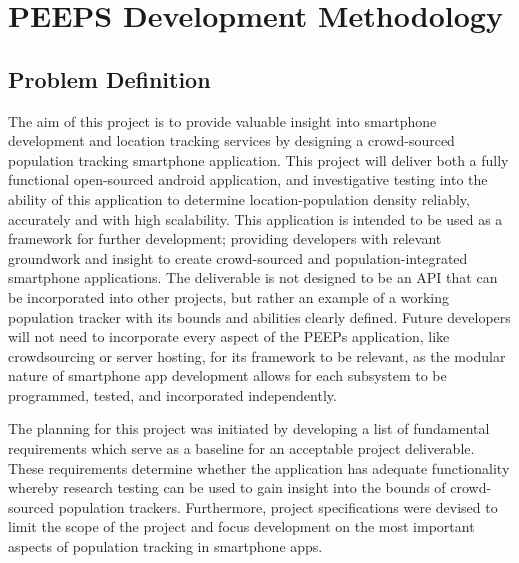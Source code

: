 \chapter{PEEPS Development Methodology}

\section{Problem Definition}
The aim of this project is to provide valuable insight into smartphone development and location tracking services by designing a crowd-sourced population tracking smartphone application. This project will deliver both a fully functional open-sourced android application, and investigative testing into the ability of this application to determine location-population density reliably, accurately and with high scalability. This application is intended to be used as a framework for further development; providing developers with relevant groundwork and insight to create crowd-sourced and population-integrated smartphone applications. The deliverable is not designed to be an API that can be incorporated into other projects, but rather an example of a working population tracker with its bounds and abilities clearly defined. Future developers will not need to incorporate every aspect of the PEEPs application, like crowdsourcing or server hosting, for its framework to be relevant, as the modular nature of smartphone app development allows for each subsystem to be programmed, tested, and incorporated independently.

The planning for this project was initiated by developing a list of fundamental requirements which serve as a baseline for an acceptable project deliverable. These requirements determine whether the application has adequate functionality whereby research testing can be used to gain insight into the bounds of crowd-sourced population trackers. Furthermore, project specifications were devised to limit the scope of the project and focus development on the most important aspects of population tracking in smartphone apps. 

